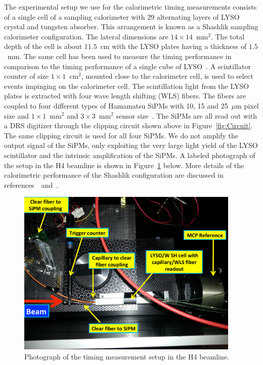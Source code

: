 The experimental setup we use for the calorimetric timing measurements consists
of a single cell of a sampling calorimeter with 29 alternating layers of LYSO
crystal and tungsten absorber. This arrangement is known as a Shashlik sampling
calorimeter configuration. The lateral dimensions are
$14\times14$~$\mathrm{mm}^{2}$. The total depth of the cell is about $11.5$~cm
with the LYSO plates having a thickness of $1.5$~mm. The same cell has been used
to measure the timing performance in comparison to the timing performance of a
single cube of LYSO~\cite{Anderson:2015gha}. 
A scintillator counter of size $1\times 1$~$\mathrm{cm}^{2}$, 
mounted close to the calorimeter cell, is used to select events impinging on the calorimeter cell.
The scintillation light from the LYSO
plates is extracted with four wave length shifting (WLS) fibers. The fibers are
coupled to four different types of Hamamatsu SiPMs with 10, 15 and 25~$\mu$m pixel size
and $1\times 1$~$\mathrm{mm}^{2}$ and $3\times 3$~$\mathrm{mm}^{2}$ sensor
size~\cite{hamamatsuMPPC}. The SiPMs are all read out with a DRS digitizer through the
clipping circuit shown above in Figure~\ref{fig:Circuit}. The same clipping circuit is 
used for all four SiPMs. We do not amplify the output
signal of the SiPMs, only exploiting the very large light yield of the LYSO
scintillator and the intrinsic amplification of the SiPMs. A labeled photograph
of the setup in the H4 beamline is shown in Figure~\ref{fig:TestbeamSetup}
below. More details of the calorimetric performance of the Shashlik
configuration are discussed in references~\cite{shashlik1}~and~\cite{shashlik2}.

\begin{figure}[htbp] 
\centering
\includegraphics[width=0.95\textwidth]{figures/ShashlikTBSetupDiagram} 
\caption{Photograph of the timing measurement setup in the H4 beamline.} 
\label{fig:TestbeamSetup} 
\end{figure} 

